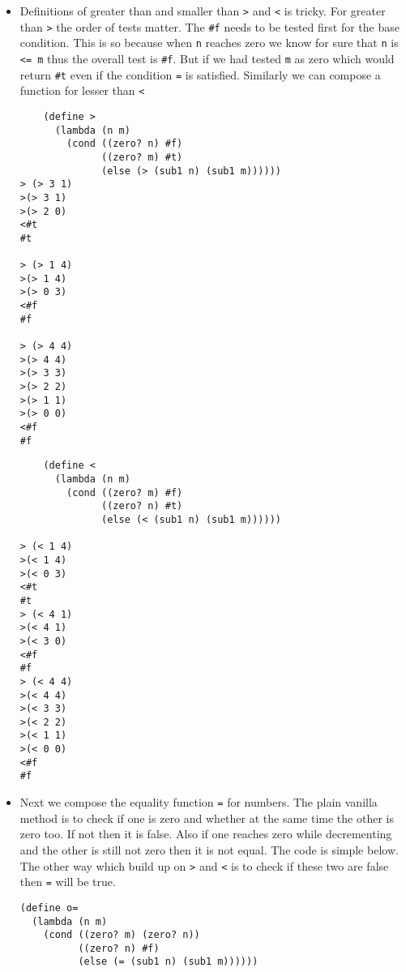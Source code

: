\documentclass[11pt]{article}
\begin{document}
\begin{itemize}
\begin{verbatim}
> (tup+ '(1 2 3 4) '(4 3 2 1))
>(tup+ '(1 2 3 4) '(4 3 2 1))
> (tup+ '(2 3 4) '(3 2 1))
> >(tup+ '(3 4) '(2 1))
> > (tup+ '(4) '(1))
> > >(tup+ '() '())
< < <'()
< < '(5)
< <'(5 5)
< '(5 5 5)
<'(5 5 5 5)
'(5 5 5 5)

> (tup+ '(1 2 3 ) '(4 3 2 1))
>(tup+ '(1 2 3) '(4 3 2 1))
> (tup+ '(2 3) '(3 2 1))
> >(tup+ '(3) '(2 1))
> > (tup+ '() '(1))
< < '(1)
< <'(5 1)
< '(5 5 1)
<'(5 5 5 1)
'(5 5 5 1)

> (tup+ '(1 2 3 4) '(4 3 2))
>(tup+ '(1 2 3 4) '(4 3 2))
> (tup+ '(2 3 4) '(3 2))
> >(tup+ '(3 4) '(2))
> > (tup+ '(4) '())
< < '(4)
< <'(5 4)
< '(5 5 4)
<'(5 5 5 4)
'(5 5 5 4)

\end{verbatim}
\item Definitions of greater than and smaller than \texttt{>} and \texttt{<} is tricky. For greater than \texttt{>} the order of tests  matter. The \texttt{\#f} needs to
be tested first for the base condition. This is so because when \texttt{n} reaches zero we know for sure that \texttt{n} is \texttt{<= m} thus the overall test
is \texttt{\#f}. But if we had tested \texttt{m} as zero which would return \texttt{\#t} even if the condition \texttt{=} is satisfied. Similarly we can compose a function
for lesser than \texttt{<}
\begin{verbatim}
    (define >
      (lambda (n m)
        (cond ((zero? n) #f)
              ((zero? m) #t)
              (else (> (sub1 n) (sub1 m))))))
> (> 3 1)
>(> 3 1)
>(> 2 0)
<#t
#t

> (> 1 4)
>(> 1 4)
>(> 0 3)
<#f
#f

> (> 4 4)
>(> 4 4)
>(> 3 3)
>(> 2 2)
>(> 1 1)
>(> 0 0)
<#f
#f

\end{verbatim}

\begin{verbatim}
    (define <
      (lambda (n m)
        (cond ((zero? m) #f)
              ((zero? n) #t)
              (else (< (sub1 n) (sub1 m))))))

> (< 1 4)
>(< 1 4)
>(< 0 3)
<#t
#t
> (< 4 1)
>(< 4 1)
>(< 3 0)
<#f
#f
> (< 4 4)
>(< 4 4)
>(< 3 3)
>(< 2 2)
>(< 1 1)
>(< 0 0)
<#f
#f

\end{verbatim}
\item Next we compose the equality function \texttt{=} for numbers. The plain vanilla method is to check if one is zero and whether at the same time the
other is zero too. If not then it is false. Also if one reaches zero while decrementing and the other is still not zero then it is not equal.
The code is simple below. The other way which build up on \texttt{>} and \texttt{<} is to check if these two are false then \texttt{=} will be true.
\begin{verbatim}
(define o=
  (lambda (n m)
    (cond ((zero? m) (zero? n))
          ((zero? n) #f)
          (else (= (sub1 n) (sub1 m))))))


\end{verbatim}
\end{itemize}
\end{document}
